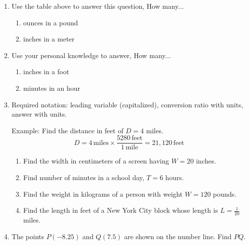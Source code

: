 \begin{enumerate}

\item Use the table above to answer this question, How many...
  \begin{multicols}{2}
    \begin{enumerate}[itemsep=1cm]
      \item ounces in a pound
      \item inches in a meter
    \end{enumerate}
  \end{multicols}

\item Use your personal knowledge to answer, How many...
  \begin{multicols}{2}
    \begin{enumerate}[itemsep=1cm]
      \item inches in a foot
      \item minutes in an hour
    \end{enumerate}
  \end{multicols}

\item Required notation: leading variable (capitalized), conversion ratio with units, answer with units. \par \smallskip
  Example: Find the distance in feet of $D=4$ miles.
  $$D = 4 \,\mathrm{miles} \times \displaystyle \frac{5280 \,\mathrm{feet}}{1 \,\mathrm{mile}} = 21,120 \,\mathrm{feet}$$
  \begin{enumerate}[itemsep=2cm]
    \item Find the width in centimeters of a screen having $W= 20$ inches.
    \item Find number of minutes in a school day, $T=6$ hours.
    \item Find the weight in kilograms of a person with weight $W=120$ pounds.
    \item Find the length in feet of a New York City block whose length is $L=\frac{1}{20}$ miles.
  \end{enumerate}

\newpage
\item The points $P(-8.25)$ and $Q(7.5)$ are shown on the number line. Find $PQ$. \par \smallskip
{} \vspace{2cm}


\end{enumerate}
